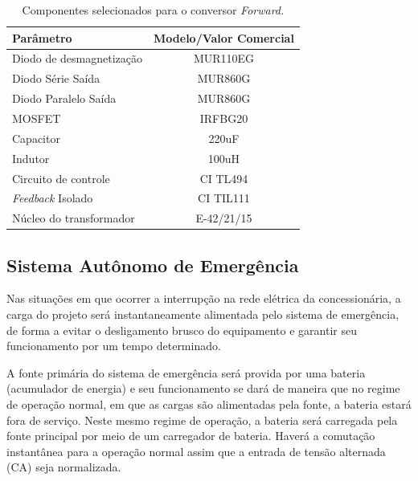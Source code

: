 \begin{table}[H]
    \centering
    \footnotesize
    \caption{Componentes selecionados para o conversor \textit{Forward.}}
    \label{Conversor_cc/cc2}
    \begin{adjustbox}{max width = \textwidth}
        \begin{tabular}{|l|c|}
            \hline
            \rowcolor[HTML]{A8DADC}
            Parâmetro & Modelo/Valor Comercial
            \\ \hline
            Diodo de desmagnetização &  MUR110EG
            \\ \hline
            Diodo Série Saída &  MUR860G
            \\ \hline
            Diodo Paralelo Saída & MUR860G
             \\ \hline
              MOSFET & IRFBG20
             \\ \hline
              Capacitor & 220uF
             \\ \hline
              Indutor & 100uH
             \\ \hline
              Circuito de controle & CI TL494
             \\ \hline
              \textit{Feedback} Isolado & CI TIL111
             \\ \hline
              Núcleo do transformador & E-42/21/15
             \\ \hline
        \end{tabular}
    \end{adjustbox}
\end{table} 

\subsection{Sistema Autônomo de Emergência}

Nas situações em que ocorrer a interrupção na rede elétrica da concessionária, a carga do projeto será instantaneamente alimentada pelo sistema de emergência, de forma a evitar o desligamento brusco do equipamento e garantir seu funcionamento por um tempo determinado. 

A fonte primária do sistema de emergência será provida por uma bateria (acumulador de energia) e seu funcionamento se dará de maneira que no regime de operação normal, em que as cargas são alimentadas pela fonte, a bateria estará fora de serviço. Neste mesmo regime de operação, a bateria será carregada pela fonte principal por meio de um carregador de bateria. Haverá a comutação instantânea para a operação normal assim que a entrada de tensão alternada (CA) seja normalizada.

